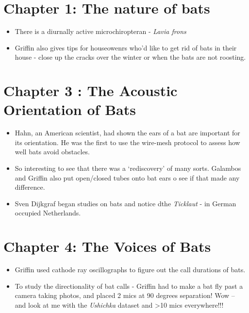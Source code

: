 \documentclass[
]{book}
\providecommand{\tightlist}{%
  \setlength{\itemsep}{0pt}\setlength{\parskip}{0pt}}
\begin{document}
\hypertarget{chapter-1-the-nature-of-bats}{%
\section{Chapter 1: The nature of bats}\label{chapter-1-the-nature-of-bats}}

\begin{itemize}
\tightlist
\item
  There is a diurnally active microchiropteran - \emph{Lavia frons}
\item
  Griffin also gives tips for houseowenrs who'd like to get rid of bats in their house - close up the cracks over the winter or when the bats are not roosting.
\end{itemize}

\hypertarget{chapter-3-the-acoustic-orientation-of-bats}{%
\section{Chapter 3 : The Acoustic Orientation of Bats}\label{chapter-3-the-acoustic-orientation-of-bats}}

\begin{itemize}
\item
  Hahn, an American scientist, had shown the ears of a bat are important for its orientation. He was the first to use the wire-mesh protocol to assess how well bats avoid obstacles.
\item
  So interesting to see that there was a `rediscovery' of many sorts. Galambos and Griffin also put open/closed tubes onto bat ears o see if that made any difference.
\item
  Sven Dijkgraf began studies on bats and notice dthe \emph{Ticklaut} - in German occupied Netherlands.
\end{itemize}

\hypertarget{chapter-4-the-voices-of-bats}{%
\section{Chapter 4: The Voices of Bats}\label{chapter-4-the-voices-of-bats}}

\begin{itemize}
\item
  Griffin used cathode ray oscillographs to figure out the call durations of bats.
\item
  To study the directionality of bat calls - Griffin had to make a bat fly past a camera taking photos, and placed 2 mics at 90 degrees separation! Wow -- and look at me with the \emph{Ushichka} dataset and \textgreater10 mics everywhere!!!
\end{itemize}
\end{document}
